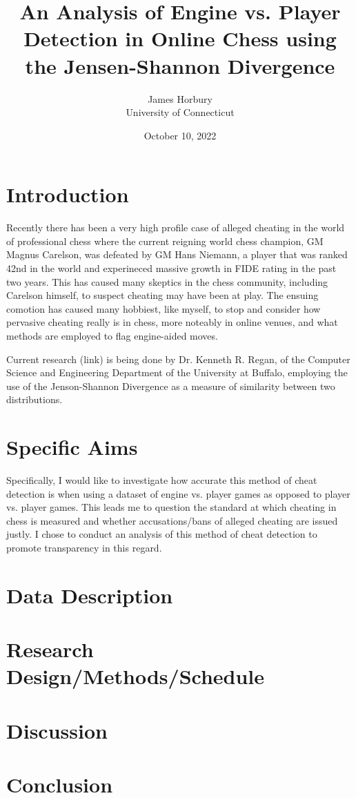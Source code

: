 \documentclass[12pt]{article}
\title{An Analysis of Engine vs. Player Detection in Online Chess using the Jensen-Shannon Divergence}
\author{James Horbury\\
    University of Connecticut
}
\date{October 10, 2022}
\begin{document}
\maketitle

\section*{Introduction}
\label{sec:intro}

Recently there has been a very high profile case of alleged cheating in the world of professional chess 
where the current reigning world chess champion, GM Magnus Carelson, was defeated by GM Hans Niemann, a player 
that was ranked 42nd in the world and experineced massive growth in FIDE rating in the past two years. This 
has caused many skeptics in the chess community, including Carelson himself, to suspect cheating may have been at
play. The ensuing comotion has caused many hobbiest, like myself, to stop and consider how pervasive cheating
really is in chess, more noteably in online venues, and what methods are employed to flag engine-aided moves.

Current research (link) is being done by Dr. Kenneth R. Regan, of the Computer Science and Engineering 
Department of the University at Buffalo, employing the use of the Jenson-Shannon Divergence as a measure of 
similarity between two distributions.

\section*{Specific Aims}
\label{sec:spec}

Specifically, I would like to investigate how accurate this method of cheat detection is when using a dataset 
of engine vs. player games as opposed to player vs. player games. This leads me to question the standard at 
which cheating in chess is measured and whether accusations/bans of alleged cheating are issued justly. I chose 
to conduct an analysis of this method of cheat detection to promote transparency in this regard.

\section*{Data Description}
\label{sec:data}



\section*{Research Design/Methods/Schedule}
\label{sec:res}

\section*{Discussion}
\label{sec:disc}

\section*{Conclusion}
\label{sec:conc}



\end{document}
